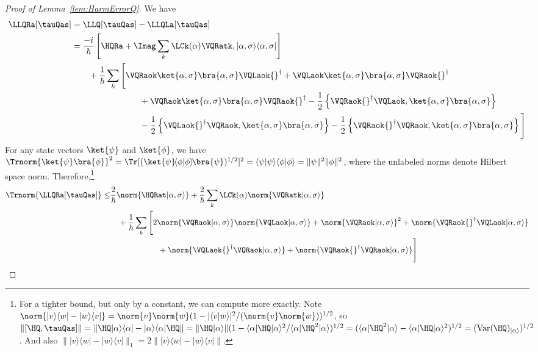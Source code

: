 \documentclass{article}
\numberwithin{equation}{section}
\begin{document}
\begin{proof}[Proof of Lemma~\ref{lem:HarmErrorQ}]
	We have
	\begin{align}\begin{split}
		\LLQRa[\tauQas] &= \LLQ[\tauQas] - \LLQLa[\tauQas]\\
		&= \frac{-i}{\hbar} \left[\HQRa + \Imag \sum_k \LCk(\alpha) \VQRatk ,|\alpha,\sigma\rangle\langle\alpha,\sigma |\right]  \\
		&\qquad + \frac{1}{\hbar} \sum_k \Bigg[ \VQRaok \ket{\alpha,\sigma }\bra{\alpha,\sigma } \VQLaok{}^\dagger + \VQLaok \ket{\alpha,\sigma }\bra{\alpha,\sigma } \VQRaok{}^\dagger  \\
		& \qquad\qquad\qquad\qquad + \VQRaok \ket{\alpha,\sigma }\bra{\alpha,\sigma } \VQRaok{}^\dagger -\frac{1}{2} \left\{\VQRaok{}^\dagger \VQLaok, \ket{\alpha,\sigma }\bra{\alpha,\sigma } \right\}  \\
		& \qquad\qquad\qquad\qquad -\frac{1}{2} \left\{\VQLaok{}^\dagger \VQRaok, \ket{\alpha,\sigma }\bra{\alpha,\sigma } \right\} -\frac{1}{2} \left\{\VQRaok{}^\dagger \VQRaok, \ket{\alpha,\sigma }\bra{\alpha,\sigma } \right\} \Bigg]
	\end{split}\end{align}
    For any state vectors $\ket{\psi}$ and $\ket{\phi}$, we have $\Trnorm{\ket{\psi}\bra{\phi}}^2 = \Tr[(\ket{\psi}\!\langle \phi|\phi\rangle\!\bra{\psi})^{1/2}]^2 = \langle \psi|\psi\rangle\langle \phi|\phi\rangle = \|\psi\|^2 \|\phi\|^2$, where the unlabeled norms denote Hilbert space norm.
	Therefore,\footnote{For a tighter bound, but only by a constant, we can compute more exactly.  
    Note $\norm{|v\rangle\langle w| - |w\rangle\langle v|} = \norm{v}\norm{w} (1- |\langle v|w\rangle|^2/(\norm{v}\norm{w}))^{1/2}$, so $\|[\HQ,\tauQas]\| = \|\HQ|\alpha\rangle \langle \alpha| - |\alpha\rangle \langle \alpha | \HQ \| = \|\HQ|\alpha\rangle\| (1-\langle \alpha | \HQ |\alpha \rangle^2/\langle \alpha | \HQ^2 | \alpha\rangle )^{1/2} = (\langle \alpha | \HQ^2 | \alpha \rangle - \langle \alpha | \HQ | \alpha \rangle^2)^{1/2} = (\textrm{Var}(\HQ)_{|\alpha\rangle})^{1/2}$.  And also $\||v\rangle\langle w| - |w\rangle\langle v|\|_1 = 2 \||v\rangle\langle w| - |w\rangle\langle v|\|$. } 
	\begin{align}
        \begin{split}\label{eq:quantum-error-initial-expansion}
			\Trnorm{ \LLQRa[\tauQas] }  \leq & \frac{2}{\hbar} \norm{ \HQRat|\alpha,\sigma \rangle } + \frac{2}{\hbar}\sum_k \LCk(\alpha) \norm{ \VQRatk|\alpha,\sigma \rangle }   \\
			&\quad + \frac{1}{\hbar} \sum_k \Bigg[  2 \norm{ \VQRaok  |\alpha,\sigma \rangle} \norm{ \VQLaok |\alpha,\sigma \rangle}   +\norm{ \VQRaok  |\alpha,\sigma \rangle}^2 +\norm{ \VQRaok{}^\dagger \VQLaok |\alpha,\sigma \rangle} \\
			&\qquad\qquad\qquad   +\norm{ \VQLaok{}^\dagger \VQRaok |\alpha,\sigma \rangle}  +\norm{ \VQRaok{}^\dagger \VQRaok |\alpha,\sigma \rangle}   \Bigg]
	\end{split}
        \end{align}
        

\end{proof}
\end{document}
